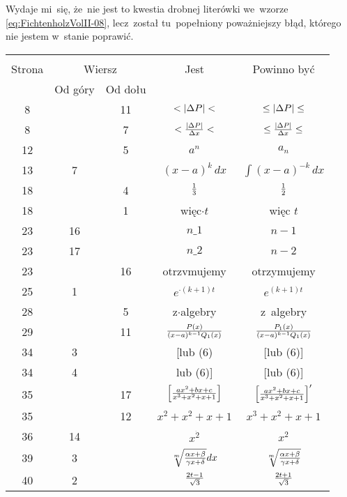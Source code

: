 \documentclass[a4paper,11pt]{article}
\begin{document}
Wydaje mi~się, że~nie jest to kwestia drobnej literówki we~wzorze
\eqref{eq:FichtenholzVolII-08}, lecz~został tu~popełniony poważniejszy
błąd, którego nie jestem w~stanie poprawić.

\vspace{\spaceFour}












\begin{center}
  \begin{tabular}{|c|c|c|c|c|}
    \hline
    & \multicolumn{2}{c|}{} & & \\
    Strona & \multicolumn{2}{c|}{Wiersz} & Jest
                              & Powinno być \\ \cline{2-3}
    & Od góry & Od dołu & & \\
    \hline
    8   & & 11 & $< | \Delta P | <$ & $\leq | \Delta P | \leq$ \\
    8   & &  7 & $< \frac{ | \Delta P | }{ \Delta x } <$
           & $\leq \frac{ | \Delta P | }{ \Delta x } \leq$ \\
    12  & &  5 & $a^{ n }$ & $a_{ n }$ \\
    13  &  7 & & $( x - a )^{ k }\, dx$ & $\int ( x - a )^{ -k }\, dx$ \\
    18  & &  4 & $\frac{ 1 }{ 3 }$ & $\frac{ 1 }{ 2 }$ \\
    18  & &  1 & więc$\cdot t$ & więc $t$ \\
    23  & 16 & & $n \_ 1$ & $n - 1$ \\
    23  & 17 & & $n \_ 2$ & $n - 2$ \\
    23  & & 16 & otrzvmujemy & otrzymujemy \\
    25  &  1 & & $e^{ \cdot (k + 1) t}$ & $e^{ (k + 1) t}$ \\
    28  & &  5 & z$\cdot$algebry & z~algebry \\
    29  & & 11 & $\frac{ P(x) }{ (x - a)^{k - 1} Q_{ 1 }(x) }$
           & $\frac{ P_{ 1 }(x) }{ (x - a)^{k - 1} Q_{ 1 }(x) }$ \\
    34  &  3 & & [lub (6) & [lub (6)] \\
    34  &  4 & & lub (6)] & [lub (6)] \\
    35  & & 17 & $\left[ \frac{ a x^{ 2 } + b x + c }
                 { x^{ 3 } + x^{ 2 } + x + 1 } \right]$
           & $\left[ \frac{ a x^{ 2 } + b x + c }
             { x^{ 3 } + x^{ 2 } + x + 1 } \right]'$ \\
    35  & & 12 & $x^{ 2 } + x^{ 2 } + x + 1$
           & $x^{ 3 } + x^{ 2 } + x + 1$ \\
    36  & 14 & & $x^{ \dot{ 2 } }$ & $x^{ 2 }$ \\
    39  &  3 & & $\sqrt[ m ]{ \frac{ \alpha x + \beta }{ \gamma x + \delta } } dx$
           & $\sqrt[ m ]{ \frac{ \alpha x + \beta }{ \gamma x + \delta } }$ \\
    40  &  2 & & $\frac{ 2t - 1 }{ \sqrt{ 3 } }$
           & $\frac{ 2t + 1 }{ \sqrt{ 3 } }$ \\
    \hline
  \end{tabular}


\end{center}
\end{document}
